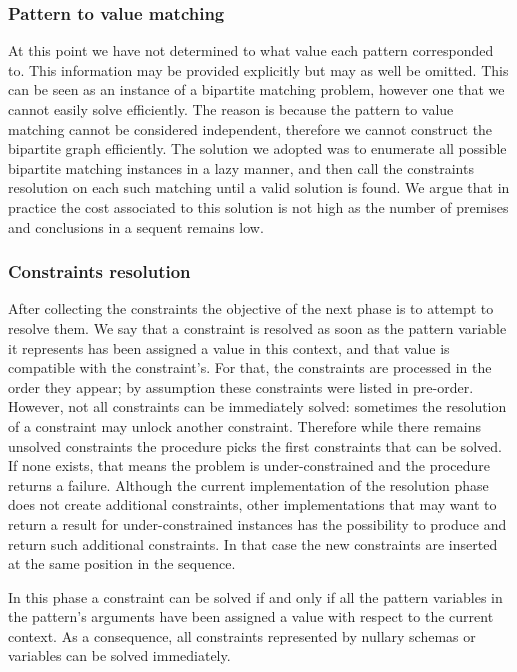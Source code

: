\subsubsection{Pattern to value matching}

At this point we have not determined to what value each pattern corresponded to. This information may be provided explicitly but may as well be omitted. This can be seen as an instance of a bipartite matching problem, however one that we cannot easily solve efficiently. The reason is because the pattern to value matching cannot be considered independent, therefore we cannot construct the bipartite graph efficiently. The solution we adopted was to enumerate all possible bipartite matching instances in a lazy manner, and then call the constraints resolution on each such matching until a valid solution is found. We argue that in practice the cost associated to this solution is not high as the number of premises and conclusions in a sequent remains low.

\subsubsection{Constraints resolution}

After collecting the constraints the objective of the next phase is to attempt to resolve them. We say that a constraint is resolved as soon as the pattern variable it represents has been assigned a value in this context, and that value is compatible with the constraint's. For that, the constraints are processed in the order they appear; by assumption these constraints were listed in pre-order. However, not all constraints can be immediately solved: sometimes the resolution of a constraint may unlock another constraint. Therefore while there remains unsolved constraints the procedure picks the first constraints that can be solved. If none exists, that means the problem is under-constrained and the procedure returns a failure. Although the current implementation of the resolution phase does not create additional constraints, other implementations that may want to return a result for under-constrained instances has the possibility to produce and return such additional constraints. In that case the new constraints are inserted at the same position in the sequence.

In this phase a constraint can be solved if and only if all the pattern variables in the pattern's arguments have been assigned a value with respect to the current context. As a consequence, all constraints represented by nullary schemas or variables can be solved immediately.

